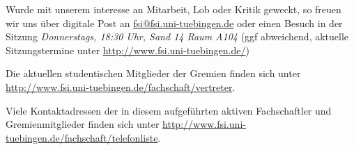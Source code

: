 Wurde mit unserem \name{} interesse an Mitarbeit, Lob oder Kritik
geweckt, so freuen wir uns über digitale Post an
\url{fsi@fsi.uni-tuebingen.de} oder einen Besuch in der Sitzung
\textit{Donnerstags, 18:30 Uhr, Sand 14 Raum A104} (ggf abweichend,
aktuelle Sitzungstermine unter \url{http://www.fsi.uni-tuebingen.de/}) 

Die aktuellen studentischen Mitglieder der Gremien finden sich unter
\url{http://www.fsi.uni-tuebingen.de/fachschaft/vertreter}. 

Viele Kontaktadressen der in diesem \name{} aufgeführten aktiven Fachschaftler
und Gremienmitglieder finden sich unter
\url{http://www.fsi.uni-tuebingen.de/fachschaft/telefonliste}.
